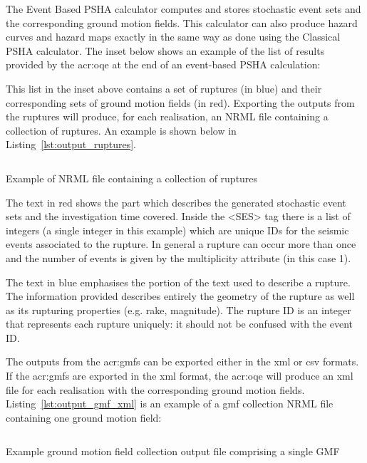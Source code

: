 The Event Based PSHA calculator computes and stores stochastic event sets and
the corresponding ground motion fields. This calculator can also produce
hazard curves and hazard maps exactly in the same way as done using the
Classical PSHA calculator. The inset below shows an example of the list of
results provided by the \gls{acr:oqe} at the end of an event-based PSHA
calculation:



This list in the inset above contains a set of ruptures (in blue) and their
corresponding sets of ground motion fields (in red). Exporting the outputs
from the ruptures will produce, for each realisation, an NRML file containing
a collection of ruptures. An example is shown below in Listing~\ref{lst:output_ruptures}.


\begin{listing}[htbp]
  \inputminted[firstline=1,firstnumber=1,fontsize=\footnotesize,frame=single,linenos,bgcolor=lightgray]{xml}{oqum/hazard/verbatim/output_ses.xml}
  \caption{Example of NRML file containing a collection of ruptures}
  \label{lst:output_ruptures}
\end{listing}

The text in red shows the part which describes the generated
stochastic event sets and the investigation time covered. Inside the
<SES> tag there is a list of integers (a single integer in this example)
which are unique IDs for the seismic events associated to the rupture.
In general a rupture can occur more than once and the number of events
is given by the multiplicity attribute (in this case 1).

The text in blue emphasises the portion of the text used to describe a
rupture. The information provided describes entirely the geometry of the
rupture as well as its rupturing properties (e.g. rake, magnitude). The
rupture ID is an integer that represents each rupture uniquely: it should
not be confused with the event ID.

The outputs from the \glspl{acr:gmf} can be exported either in the xml or csv
formats. If the \glspl{acr:gmf} are exported in the xml format, the
\gls{acr:oqe} will produce an xml file for each realisation with the
corresponding ground motion fields. Listing~\ref{lst:output_gmf_xml} is an
example of a gmf collection NRML file containing one ground motion field:

\begin{listing}[htbp]
  \inputminted[firstline=1,firstnumber=1,fontsize=\footnotesize,frame=single,linenos,bgcolor=lightgray]{xml}{oqum/hazard/verbatim/output_gmf.xml}
  \caption{Example ground motion field collection output file comprising a single GMF}
  \label{lst:output_gmf_xml}
\end{listing}


